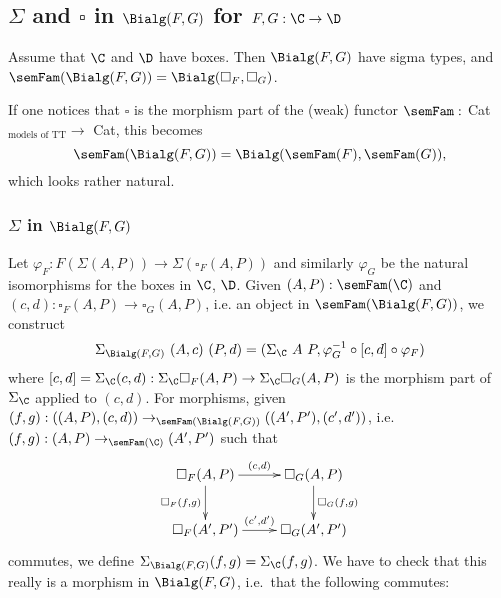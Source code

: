 \documentclass{article}
\begin{document}
\subsection{$\Sigma$ and $\square$ in $\Bialg(F, G)$ for $F, G : \C \to \D$}

Assume that $\C$ and $\D$ have boxes. Then $\Bialg(F, G)$ have sigma
types, and $\semFam(\Bialg(F, G)) = \Bialg(\square_F, \square_G)$.

\begin{remark}
  If one notices that $\square$ is the morphism part of the (weak)
  functor $\semFam :$ Cat$_{\text{models of TT}} \to $ Cat, this
  becomes
  \[
  \semFam(\Bialg(F, G)) = \Bialg(\semFam(F), \semFam(G)),
  \]
  which looks rather natural.
\end{remark}


\subsubsection{$\Sigma$ in $\Bialg(F, G)$}

Let $\varphi_F : F (\Sigma(A, P)) \to \Sigma(\square_F(A, P))$ and
similarly $\varphi_G$ be the natural isomorphisms for the boxes in
$\C$, $\D$. Given $(A, P) : \semFam(\C)$ and $(c, d) : \square_F(A, P)
\to \square_G(A, P)$, i.e. an object in $\semFam(\Bialg(F, G))$, we
construct
\[
\Sigma_{\Bialg(F, G)}\ (A, c)\ (P, d) = (\Sigma_{\C}\ A\ P, \varphi^{-1}_G \circ [c, d] \circ \varphi_F)
\]
where $[c, d] = \Sigma_\C(c, d) : \Sigma_\C \square_F(A, P) \to
\Sigma_\C \square_G(A, P)$ is the morphism part of $\Sigma_\C$ applied
to $(c, d)$. For morphisms, given $(f, g) : ((A, P), (c, d))
\to_{\semFam(\Bialg(F, G))} ((A', P'), (c', d'))$, i.e.\ $(f, g) : (A,
P) \to_{\semFam(\C)} (A', P')$ such that
\begin{equation}
\label{eq:331}
\xymatrix{
\square_F(A, P) \ar^-{(c, d)}[r] \ar_-{\square_F(f, g)}[d] & \square_G(A, P) \ar^-{\square_G(f, g)}[d] \\
\square_F(A', P') \ar^-{(c', d')}[r] & \square_G(A', P') \\
}
\end{equation}
commutes, we define $\Sigma_{\Bialg(F, G)}(f, g) = \Sigma_{\C}(f, g)$.
We have to check that this really is a morphism in
$\Bialg(F, G)$, i.e.\ that the following commutes:
\end{document}
